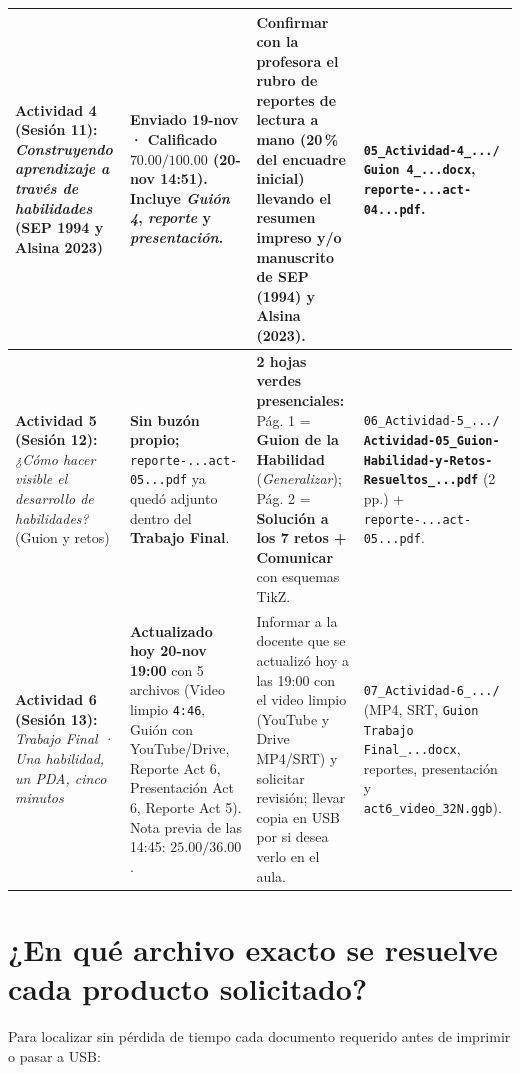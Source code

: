 \documentclass[spanish,letterpaper,oneside]{article}
\begin{document}
{\begin{longtable}{|>{\raggedright\arraybackslash}p{}|>{\raggedright\arraybackslash}p{}|>{\raggedright\arraybackslash}p{}|>{\raggedright\arraybackslash}p{}|}
\textbf{Actividad 4 (Sesión 11):} \textit{Construyendo aprendizaje a través de habilidades} (SEP 1994 y Alsina 2023) &
\textbf{Enviado 19-nov · Calificado $70.00/100.00$} (20-nov 14:51). Incluye \textit{Guión 4}, \textit{reporte} y \textit{presentación}. &
Confirmar con la profesora el rubro de \textbf{reportes de lectura a mano} (20\,\% del encuadre inicial) llevando el resumen impreso y/o manuscrito de SEP (1994) y Alsina (2023). &
\texttt{05\_Actividad-4\_.../}\newline
\texttt{Guion 4\_...docx},\newline
\texttt{reporte-...act-04...pdf}. \\\hline

\textbf{Actividad 5 (Sesión 12):} \textit{¿Cómo hacer visible el desarrollo de habilidades?} (Guion y retos) &
\textbf{Sin buzón propio;} \texttt{reporte-...act-05...pdf} ya quedó adjunto dentro del \textbf{Trabajo Final}. &
\textbf{2 hojas verdes presenciales:} Pág. 1 = \textbf{Guion de la Habilidad} (\textit{Generalizar}); Pág. 2 = \textbf{Solución a los 7 retos + Comunicar} con esquemas TikZ. &
\texttt{06\_Actividad-5\_.../}\newline
\textbf{\texttt{Actividad-05\_Guion-}}\newline
\textbf{\texttt{Habilidad-y-Retos-}}\newline
\textbf{\texttt{Resueltos\_...pdf}} (2 pp.)\newline
+ \texttt{reporte-...act-05...pdf}. \\\hline

\textbf{Actividad 6 (Sesión 13):} \textit{Trabajo Final · Una habilidad, un PDA, cinco minutos} &
\textbf{Actualizado hoy 20-nov 19:00} con 5 archivos (Video limpio \texttt{4:46}, Guión con YouTube/Drive, Reporte Act 6, Presentación Act 6, Reporte Act 5). Nota previa de las 14:45: $25.00/36.00$. &
Informar a la docente que se actualizó hoy a las 19:00 con el video limpio (YouTube y Drive MP4/SRT) y solicitar revisión; llevar copia en USB por si desea verlo en el aula. &
\texttt{07\_Actividad-6\_.../}\newline
(MP4, SRT, \texttt{Guion Trabajo Final\_...docx}, reportes, presentación y \texttt{act6\_video\_32N.ggb}). \\\hline
\end{longtable}}

\section{¿En qué archivo exacto se resuelve cada producto solicitado?}
Para localizar sin pérdida de tiempo cada documento requerido antes de imprimir o pasar a USB:
\end{document}
